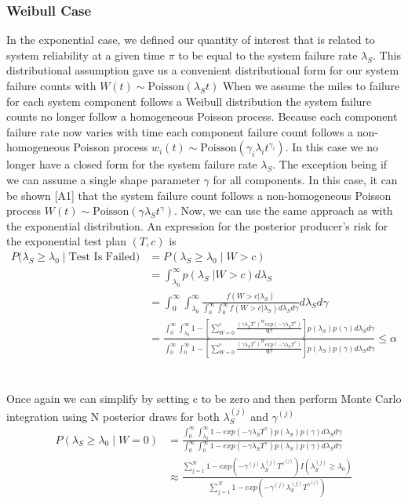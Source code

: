 \documentclass[12pt]{article}
\begin{document}
\subsubsection{Weibull Case}
In the exponential case, we defined our quantity of interest that is related to
system reliability at a given time $\pi$ to be equal to the system failure rate
$\lambda_S$.  This distributional assumption gave us a convenient distributional
form for our system failure counts with $W(t) \sim \text{Poisson}(\lambda_S t)$
When we assume the miles to failure for each system component follows a Weibull
distribution the system failure counts no longer follow a homogeneous Poisson
process.  Because each component failure rate now varies with time each
component failure count follows a non-homogeneous Poisson process $w_i(t) \sim
\text{Poisson}(\gamma_i \lambda_i t^{\gamma_i})$.  In this case we no longer
have a closed form for the system failure rate $\lambda_S$.  The exception being
if we can assume a single shape parameter $\gamma$ for all components.  In this
case, it can be shown [A1] that the system failure count follows a non-homogeneous
Poisson process $W(t) \sim \text{Poisson}(\gamma \lambda_S t^{\gamma})$.  Now,
we can use the same approach as with the exponential distribution. An expression
for the posterior producer's risk for the exponential test plan $(T,c)$ is
$$
\begin{aligned}
    P(\lambda_S \geq \lambda_0 \; \vert \; \text{Test Is Failed)} &= P(\lambda_S
    \geq \lambda_0 \; \vert \; W > c) \\ &= \int_{\lambda_0}^{\infty}
    p(\lambda_S \; \vert W > c) d\lambda_S \\ &= \int_{0}^{\infty}
    \int_{\lambda_0}^{\infty} \frac{f(W > c \vert \lambda_S)}{\int_{0}^{\infty}
    \int_{0}^{\infty} f(W > c \vert \lambda_S) d\lambda_S d\gamma} d\lambda_S
    d\gamma \\ &= \frac{\int_{0}^{\infty} \int_{\lambda_0}^{\infty} 1 -
    [\sum_{W=0}^c \frac{(\gamma \lambda_S T^{\gamma})^W exp(-\gamma \lambda_S
    T^{\gamma})}{W!}]p(\lambda_S)p(\gamma)d\lambda_S d\gamma} {\int_{0}^{\infty}
    \int_{0}^{\infty} 1 - [ \sum_{W=0}^c \frac{(\gamma \lambda_S T^{\gamma})^W
    exp(-\gamma \lambda_S T^{\gamma})} {W!}]p(\lambda_S) p(\gamma)
    d\lambda_Sd\gamma} \leq \alpha
\end{aligned}
$$
\\
\\
Once again we can simplify by setting c to be zero and then perform Monte Carlo
integration using N posterior draws for both $\lambda_S^{(j)}$ and
$\gamma^{(j)}$
$$
\begin{aligned}
	 P(\lambda_S \geq \lambda_0 \; \vert \; W = 0) &= \frac{\int_{0}^{\infty}
	 \int_{\lambda_0}^{\infty} 1 - exp(- \gamma \lambda_S T^{\gamma})p(\lambda_S)
	 p(\gamma) d\lambda_S d\gamma} {\int_{0}^{\infty} \int_{0}^{\infty} 1 - exp(-
	 \gamma \lambda_S T^{\gamma})p(\lambda_S) p(\gamma) d\lambda_S d\gamma} \\
	 &\approx \frac{\sum_{j = 1}^{N} 1 - exp(-\gamma^{(j)} \lambda_S^{(j)}
	 T^{\gamma^{(j)}}) I(\lambda_S^{(j)} \geq \lambda_0)} {\sum_{j = 1}^{N} 1 -
	 exp(- \gamma^{(j)} \lambda_S^{(j)} T^{\gamma^{(j)}})} \end{aligned}
$$
\end{document}
